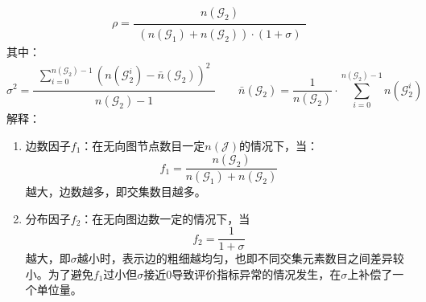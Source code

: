 \documentclass[12pt, onecolumn]{article}
\begin{document}
	\begin{equation*}
	\rho=\frac{
		\begin{aligned}
		n(\mathcal{G}_2)
		\end{aligned}
	}{
		\begin{aligned}
		\left( 	n(\mathcal{G}_1)+n(\mathcal{G}_2)\right) \cdot(1+\sigma)
		\end{aligned}
	}
	\end{equation*}
	其中：
	\begin{equation*}
	\sigma^2=	\frac{
		\begin{aligned}
		\sum_{i=0}^{n(\mathcal{G}_2)-1}
		\left( 
		n\left(\mathcal{G}_2^i \right) -\bar{n}{(\mathcal{G}_2) }
		\right) ^2
		\end{aligned}
	}{
		\begin{aligned}
		n(\mathcal{G}_2)-1
		\end{aligned}
	}
	\qquad
	\bar{n}{(\mathcal{G}_2)}=\frac{1}{n(\mathcal{G}_2)}\cdot\sum_{i=0}^{n(\mathcal{G}_2)-1}n(\mathcal{G}_2^i)
	\end{equation*}
	解释：
	\begin{enumerate}
		\item 边数因子$f_1$：在无向图节点数目一定$n(\mathcal{J})$的情况下，当：
		\begin{equation*}
		f_1=\frac{n(\mathcal{G}_2)}{n(\mathcal{G}_1)+n(\mathcal{G}_2)}
		\end{equation*}
		越大，边数越多，即交集数目越多。
		
		\item 分布因子$f_2$：在无向图边数一定的情况下，当
		\begin{equation*}
		f_2=\frac{1}{1+\sigma}
		\end{equation*}
		越大，即$\sigma$越小时，表示边的粗细越均匀，也即不同交集元素数目之间差异较小。为了避免$f_1$过小但$\sigma$接近0导致评价指标异常的情况发生，在$\sigma$上补偿了一个单位量。
	\end{enumerate}
	
\end{document}
